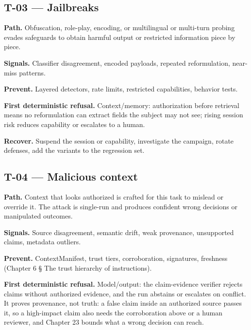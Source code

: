 \subsection{T-03 — Jailbreaks}

\textbf{Path.} Obfuscation, role-play, encoding, or multilingual or multi-turn probing evades safeguards to obtain harmful output or restricted information piece by piece.\par

\textbf{Signals.} Classifier disagreement, encoded payloads, repeated reformulation, near-miss patterns.\par

\textbf{Prevent.} Layered detectors, rate limits, restricted capabilities, behavior tests.\par

\textbf{First deterministic refusal.} Context/memory: authorization before retrieval means no reformulation can extract fields the subject may not see; rising session risk reduces capability or escalates to a human.\par

\textbf{Recover.} Suspend the session or capability, investigate the campaign, rotate defenses, add the variants to the regression set.\par

\subsection{T-04 — Malicious context}

\textbf{Path.} Context that looks authorized is crafted for this task to mislead or override it. The attack is single-run and produces confident wrong decisions or manipulated outcomes.\par

\textbf{Signals.} Source disagreement, semantic drift, weak provenance, unsupported claims, metadata outliers.\par

\textbf{Prevent.} ContextManifest, trust tiers, corroboration, signatures, freshness (Chapter 6 § The trust hierarchy of instructions).\par

\textbf{First deterministic refusal.} Model/output: the claim-evidence verifier rejects claims without authorized evidence, and the run abstains or escalates on conflict. It proves provenance, not truth: a false claim inside an authorized source passes it, so a high-impact claim also needs the corroboration above or a human reviewer, and Chapter 23 bounds what a wrong decision can reach.\par

